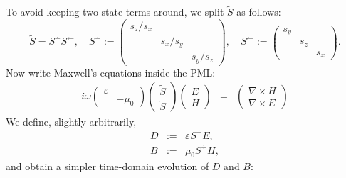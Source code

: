 \documentclass{article}
\newcommand{\assign}{:=}
\begin{document}
To avoid keeping two state terms around, we split $\tilde{S}$ as follows:
\[ \tilde{S} = S^{\div} S^{\leftarrow}, \quad S^{\div} \assign
   \left(\begin{array}{ccc}
     s_z / s_x &  & \\
     & s_x / s_y & \\
     &  & s_y / s_z
   \end{array}\right), \quad S^{\leftarrow} \assign \left(\begin{array}{ccc}
     s_y &  & \\
     & s_z & \\
     &  & s_x
   \end{array}\right) . \]
Now write Maxwell's equations inside the PML:
\begin{eqnarray*}
  i \omega \left(\begin{array}{cc}
    \varepsilon & \\
    & - \mu_0
  \end{array}\right) \left(\begin{array}{c}
    \tilde{S}\\
    \tilde{S}
  \end{array}\right) \left(\begin{array}{c}
    E\\
    H
  \end{array}\right) & = & \left(\begin{array}{c}
    \nabla \times H\\
    \nabla \times E
  \end{array}\right)
\end{eqnarray*}
We define, slightly arbitrarily,
\begin{eqnarray*}
  D & \assign & \varepsilon_{} S^{\div} E,\\
  B & \assign & \mu_0 S^{\div} H,
\end{eqnarray*}
and obtain a simpler time-domain evolution of $D$ and $B$:
\end{document}
